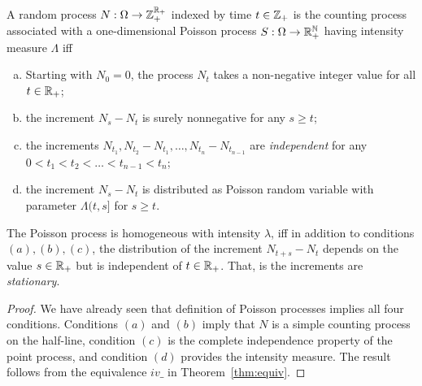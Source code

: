 \documentclass[letterpaper,10pt,english]{article}
\begin{document}
\begin{cor}
A random process $N: \Omega \to \mathbb{Z}_+^{\mathbb{R}_+}$ indexed by time $t \in \mathbb{Z}_+$ is the counting process associated with a one-dimensional Poisson process $S: \Omega \to \mathbb{R}_+^{\mathbb{N}}$ having intensity measure $\Lambda$ iff
\begin{enumerate}[(a)]
\item Starting with $N_0 = 0$, the process $N_t$ takes a non-negative integer value for all $t \in \mathbb{R}_+$;
\item the increment $N_s - N_t$ is surely nonnegative for any $s \ge t$;
\item the increments $N_{t_1}, N_{t_2} - N_{t_1},  \dots , N_{t_n} - N_{t_{n-1}}$ are \textit{independent} for any 
$0 < t_1 < t_2 < \dots < t_{n-1} < t_n$; 
\item the increment $N_s - N_t$ is distributed as Poisson random variable with parameter $\Lambda(t, s]$ for $s \ge t$.  
\end{enumerate}
The Poisson process is homogeneous with intensity $\lambda$, iff in addition to conditions $(a), (b), (c)$, 
the distribution of the increment $N_{t+s} - N_t$ depends on the value $s \in \mathbb{R}_+$ but is independent of $t \in \mathbb{R}_+$. 
That, is the increments are \textit{stationary}. 
\end{cor}
\begin{proof} 
We have already seen that definition of Poisson processes implies all four conditions. 
Conditions $(a)$ and $(b)$ imply that $N$ is a simple counting process on the half-line, 
condition $(c)$ is the complete independence property of the point process, 
and condition $(d)$ provides the intensity measure. 
The result follows from the equivalence $iv\_$ in Theorem~\ref{thm:equiv}. 
\end{proof}
\end{document}
